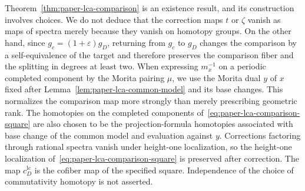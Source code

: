 \begin{remark}\label{rem:paper-lca-choice}
Theorem~\ref{thm:paper-lca-comparison} is an existence result, and its construction involves choices.
We do not deduce that the correction maps $t$ or $\zeta$ vanish as maps of spectra merely because they vanish on homotopy groups.
On the other hand, since $g_c=(1+\varepsilon)g_D$, returning from $g_c$ to $g_D$ changes the comparison by a self-equivalence of the target and therefore preserves the comparison fiber and the splitting in degrees at least two.
When expressing $m_x^{-1}$ on a periodic completed component by the Morita pairing $\mu$, we use the Morita dual $y$ of $x$ fixed after Lemma~\ref{lem:paper-lca-common-model} and its base changes.
This normalizes the comparison map more strongly than merely prescribing geometric rank.
The homotopies on the completed components of~\eqref{eq:paper-lca-comparison-square} are also chosen to be the projection-formula homotopies associated with base change of the common model and evaluation against $y$.
Corrections factoring through rational spectra vanish under height-one localization, so the height-one localization of~\eqref{eq:paper-lca-comparison-square} is preserved after correction.
The map $c^{\mathrm{lc}}_D$ is the cofiber map of the specified square.
Independence of the choice of commutativity homotopy is not asserted.
\end{remark}

